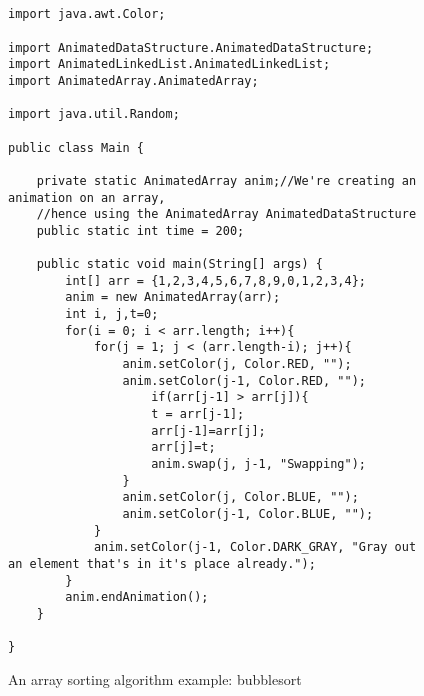 \begin{figure}
\begin{center}
\begin{verbatim}


import java.awt.Color;

import AnimatedDataStructure.AnimatedDataStructure;
import AnimatedLinkedList.AnimatedLinkedList;
import AnimatedArray.AnimatedArray;

import java.util.Random;

public class Main {
    
    private static AnimatedArray anim;//We're creating an animation on an array,
	//hence using the AnimatedArray AnimatedDataStructure
    public static int time = 200;
    
	public static void main(String[] args) {
		int[] arr = {1,2,3,4,5,6,7,8,9,0,1,2,3,4};
		anim = new AnimatedArray(arr);
		int i, j,t=0;
		for(i = 0; i < arr.length; i++){
			for(j = 1; j < (arr.length-i); j++){
				anim.setColor(j, Color.RED, "");
				anim.setColor(j-1, Color.RED, "");
					if(arr[j-1] > arr[j]){
					t = arr[j-1];
					arr[j-1]=arr[j];
					arr[j]=t;
					anim.swap(j, j-1, "Swapping");
				}
				anim.setColor(j, Color.BLUE, "");
				anim.setColor(j-1, Color.BLUE, "");
			}
			anim.setColor(j-1, Color.DARK_GRAY, "Gray out an element that's in it's place already.");
		}
        anim.endAnimation();
	}
	
}

\end{verbatim}
\end{center}
\caption{An array sorting algorithm example: bubblesort}
\label{fig:animationAlgorithm}
\end{figure}

